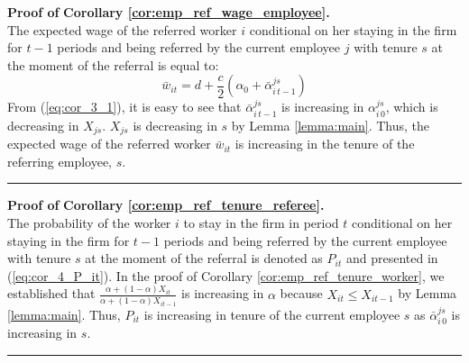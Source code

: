 \documentclass[12pt]{article}
\newenvironment{proof}[1][Proof of]{\noindent\textbf{#1} }{\ \rule{0.5em}{0.5em}}
\begin{document}
\begin{proof}
\textbf{Corollary \ref{cor:emp_ref_wage_employee}.}\\
The expected wage of the referred worker $i$ conditional on her staying in the firm for $t-1$ periods and being referred by the current employee $j$ with tenure $s$ at the moment of the referral is equal to:
\begin{equation}
\bar{w}_{it} = d+\frac{c}{2}\left(\alpha_0+\bar{\alpha}_{i\,t-1}^{js}\right)
\end{equation}
From (\ref{eq:cor_3_1}), it is easy to see that $\bar{\alpha}_{i\,t-1}^{js}$ is increasing in $\alpha_{i\,0}^{js}$, which is decreasing in $X_{js}$. $X_{js}$ is decreasing in $s$ by Lemma \ref{lemma:main}. Thus, the expected wage of the referred worker $\bar{w}_{it}$ is increasing in the tenure of the referring employee, $s$.
\end{proof}

\begin{proof}
\textbf{Corollary \ref{cor:emp_ref_tenure_referee}.}\\
The probability of the worker $i$ to stay in the firm in period $t$ conditional on her staying in the firm for $t-1$ periods and being referred by the current employee with tenure $s$ at the moment of the referral is denoted as $P_{it}$ and presented in (\ref{eq:cor_4_P_it}). In the proof of Corollary \ref{cor:emp_ref_tenure_worker}, we established that $\frac{\alpha+(1-\alpha)X_{it}}{\alpha+(1-\alpha)X_{it-1}}$ is increasing in $\alpha$ because $X_{it}\leq X_{it-1}$ by Lemma \ref{lemma:main}. Thus, $P_{it}$ is increasing in tenure of the current employee $s$ as $\bar{\alpha}_{i\,0}^{js}$ is increasing in $s$.
\end{proof}

\pagebreak
\end{document}
